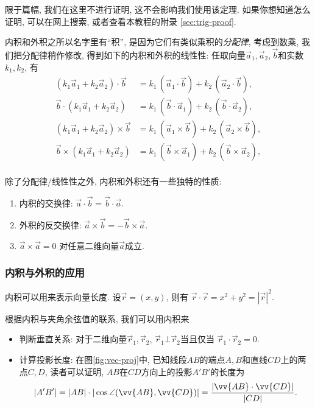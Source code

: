 限于篇幅, 我们在这里不进行证明, 这不会影响我们使用该定理.
如果你想知道怎么证明, 可以在网上搜索, 或者查看本教程的附录
\ref{sec:trig-proof}.

内积和外积之所以名字里有``积'',
是因为它们有类似乘积的\emph{分配律},
考虑到数乘, 我们把分配律稍作修改,
得到如下的内积和外积的线性性:
任取向量$\vec a_1,\vec a_2,\vec b$和实数$k_1,k_2$, 有
\begin{align*}
  (k_1\vec a_1 + k_2\vec a_2) \cdot \vec b
   & = k_1\,(\vec a_1 \cdot \vec b)
  + k_2\,(\vec a_2 \cdot \vec b),    \\
  \vec b \cdot (k_1\vec a_1 + k_2\vec a_2)
   & = k_1\,(\vec b \cdot \vec a_1)
  + k_2\,(\vec b \cdot \vec a_2),    \\
  (k_1\vec a_1 + k_2\vec a_2) \times \vec b
   & = k_1\,(\vec a_1 \times \vec b)
  + k_2\,(\vec a_2 \times \vec b),   \\
  \vec b \times (k_1\vec a_1 + k_2\vec a_2)
   & = k_1\,(\vec b \times \vec a_1)
  + k_2\,(\vec b \times \vec a_2),   \\
\end{align*}

除了分配律/线性性之外, 内积和外积还有一些独特的性质:
\begin{enumerate}[label=(\alph*)]
  \item 内积的交换律: $\vec a \cdot \vec b = \vec b \cdot \vec a$.
  \item 外积的反交换律: $\vec a\times\vec b = -\vec b\times\vec a$.
  \item $\vec a \times \vec a = 0$ 对任意二维向量$\vec a$成立.
\end{enumerate}

\subsubsection{内积与外积的应用}

内积可以用来表示向量长度. 设$\vec{r}=(x,y)$, 则有
$\vec{r}\cdot\vec{r} = x^2 + y^2 = |\vec{r}|^2$.

根据内积与夹角余弦值的联系, 我们可以用内积来
\begin{itemize}
  \item 判断垂直关系: 对于二维向量$\vec r_1,\vec r_2$,
        $\vec r_1 \bot \vec r_2$当且仅当
        $\vec r_1 \cdot \vec r_2 = 0$.
  \item 计算投影长度: 在图\ref{fig:vec-proj}中,
        已知线段$AB$的端点$A,B$和直线$CD$上的两点$C,D$,
        读者可以证明, $AB$在$CD$方向上的投影$A'B'$的长度为
        \begin{align}\label{eq:projection}
          |A'B'| = |AB|\cdot|\cos\angle(\vv{AB},\vv{CD})|
          = \dfrac{|\vv{AB}\cdot\vv{CD}|}{|CD|}.
        \end{align}
\end{itemize}

